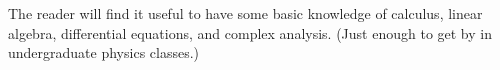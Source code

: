 \documentclass[12pt]{book}
\theoremstyle{definition}
\begin{document}
The reader will find it useful to have some basic knowledge
of calculus, linear algebra, differential equations, and complex analysis.
(Just enough to get by in undergraduate physics classes.) 

\tableofcontents                        %
\mainmatter                             %


%








\begin{appendices}





\end{appendices}

\printindex
\end{document}
